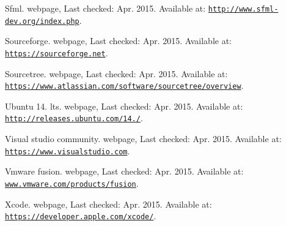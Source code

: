 \begin{DoxyDescription}
\item[\label{_CITEREF_sfml}%
\mbox{[}17\mbox{]}]Sfml. webpage, Last checked\+: Apr. 2015. Available at\+: \href{http://www.sfml-dev.org/index.php}{\tt http\+://www.\+sfml-\/dev.\+org/index.\+php}.


\item[\label{_CITEREF_sourceforge}%
\mbox{[}18\mbox{]}]Sourceforge. webpage, Last checked\+: Apr. 2015. Available at\+: \href{https://sourceforge.net}{\tt https\+://sourceforge.\+net}.


\item[\label{_CITEREF_sourcetree}%
\mbox{[}19\mbox{]}]Sourcetree. webpage, Last checked\+: Apr. 2015. Available at\+: \href{https://www.atlassian.com/software/sourcetree/overview}{\tt https\+://www.\+atlassian.\+com/software/sourcetree/overview}.


\item[\label{_CITEREF_ubuntu14_04LTS}%
\mbox{[}20\mbox{]}]Ubuntu 14. lts. webpage, Last checked\+: Apr. 2015. Available at\+: \href{http://releases.ubuntu.com/14.04/}{\tt http\+://releases.\+ubuntu.\+com/14./}.


\item[\label{_CITEREF_visualstudiocommunity}%
\mbox{[}21\mbox{]}]Visual studio community. webpage, Last checked\+: Apr. 2015. Available at\+: \href{https://www.visualstudio.com}{\tt https\+://www.\+visualstudio.\+com}.


\item[\label{_CITEREF_vmwarefusion}%
\mbox{[}22\mbox{]}]Vmware fusion. webpage, Last checked\+: Apr. 2015. Available at\+: \href{www.vmware.com/products/fusion}{\tt www.\+vmware.\+com/products/fusion}.


\item[\label{_CITEREF_xcode}%
\mbox{[}23\mbox{]}]Xcode. webpage, Last checked\+: Apr. 2015. Available at\+: \href{https://developer.apple.com/xcode/}{\tt https\+://developer.\+apple.\+com/xcode/}.


\end{DoxyDescription}